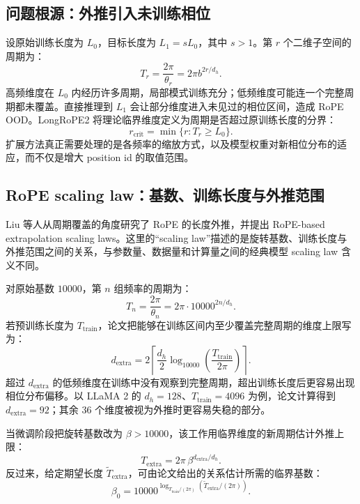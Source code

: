 \documentclass[UTF8,fontset=none,a4paper,10pt]{ctexart}
\begin{document}
\subsection{问题根源：外推引入未训练相位}

设原始训练长度为 $L_0$，目标长度为 $L_1=sL_0$，其中 $s>1$。第 $r$ 个二维子空间的周期为：
\begin{equation}
  T_r=\frac{2\pi}{\theta_r}=2\pi b^{2r/d_h}.
  \label{zh:eq:rope-period}
\end{equation}
高频维度在 $L_0$ 内经历许多周期，局部模式训练充分；低频维度可能连一个完整周期都未覆盖。直接推理到 $L_1$ 会让部分维度进入未见过的相位区间，造成 RoPE OOD。LongRoPE2 将理论临界维度定义为周期是否超过原训练长度的分界\cite{zh:longrope2}：
\begin{equation}
  r_{\mathrm{crit}}=\min\{r:T_r\ge L_0\}.
  \label{zh:eq:critical-dim}
\end{equation}
扩展方法真正需要处理的是各频率的缩放方式，以及模型权重对新相位分布的适应，而不仅是增大 position id 的取值范围。

\subsection{RoPE scaling law：基数、训练长度与外推范围}

Liu 等人从周期覆盖的角度研究了 RoPE 的长度外推，并提出 RoPE-based extrapolation scaling laws\cite{zh:liu2024scalingrope}。这里的“scaling law”描述的是旋转基数、训练长度与外推范围之间的关系，与参数量、数据量和计算量之间的经典模型 scaling law 含义不同。

对原始基数 $10000$，第 $n$ 组频率的周期为：
\begin{equation}
  T_n=\frac{2\pi}{\theta_n}=2\pi\cdot10000^{2n/d_h}.
  \label{zh:eq:scaling-period}
\end{equation}
若预训练长度为 $T_{\mathrm{train}}$，论文把能够在训练区间内至少覆盖完整周期的维度上限写为：
\begin{equation}
  d_{\mathrm{extra}}
  =2\left\lceil
  \frac{d_h}{2}\log_{10000}\!\left(\frac{T_{\mathrm{train}}}{2\pi}\right)
  \right\rceil.
  \label{zh:eq:critical-dimension-scaling-law}
\end{equation}
超过 $d_{\mathrm{extra}}$ 的低频维度在训练中没有观察到完整周期，超出训练长度后更容易出现相位分布偏移。以 LLaMA 2 的 $d_h=128$、$T_{\mathrm{train}}=4096$ 为例，论文计算得到 $d_{\mathrm{extra}}=92$；其余 36 个维度被视为外推时更容易失稳的部分\cite{zh:liu2024scalingrope}。

当微调阶段把旋转基数改为 $\beta>10000$，该工作用临界维度的新周期估计外推上限：
\begin{equation}
  T_{\mathrm{extra}}
  =2\pi\,\beta^{d_{\mathrm{extra}}/d_h}.
  \label{zh:eq:scaling-law-upper-bound}
\end{equation}
反过来，给定期望长度 $\widetilde T_{\mathrm{extra}}$，可由论文给出的关系估计所需的临界基数：
\begin{equation}
  \beta_0
  =10000^{\log_{T_{\mathrm{train}}/(2\pi)}
  \left(\widetilde T_{\mathrm{extra}}/(2\pi)\right)}.
  \label{zh:eq:scaling-law-critical-base}
\end{equation}
\end{document}
